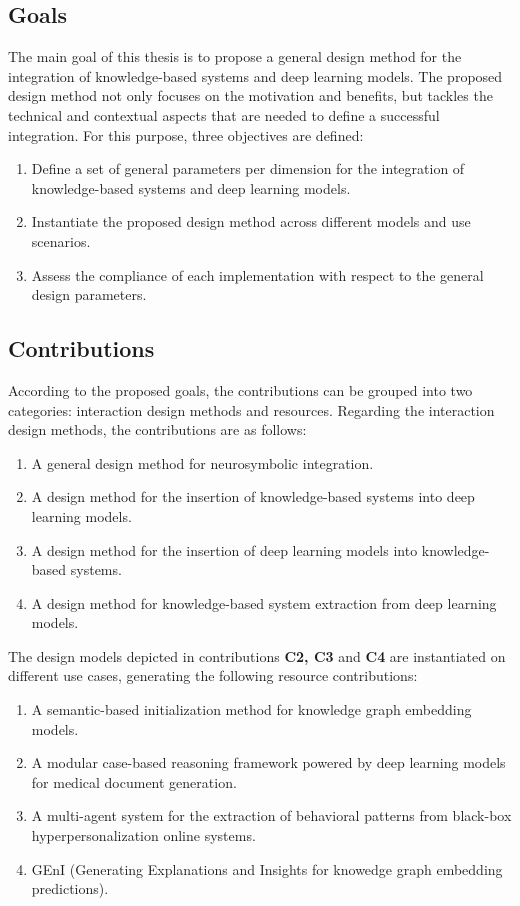 \subsection{Goals}
The main goal of this thesis is to propose a general design method for the integration of knowledge-based systems and deep learning models.  The proposed design method not only focuses on the motivation and benefits, but tackles the technical and contextual aspects that are needed to define a successful integration. For this purpose, three objectives are defined:
\begin{enumerate}[start=1,label={\bfseries O\arabic*:}]
    \item Define a set of general parameters per dimension for the integration of knowledge-based systems and deep learning models.
    \item Instantiate the proposed design method across different models and use scenarios.
    \item Assess the compliance of each implementation with respect to the general design parameters. 
\end{enumerate}

\subsection{Contributions}
According to the proposed goals, the contributions can be grouped into two categories: interaction design methods and resources.
Regarding the interaction design methods, the contributions are as follows:
\begin{enumerate}[start=1,label={\bfseries C\arabic*:}]
    \item A general design method for neurosymbolic integration.
    \item A design method for the insertion of knowledge-based systems into deep learning models.
    \item A design method for the insertion of deep learning models into knowledge-based systems.
    \item A design method for knowledge-based system extraction from deep learning models.
\end{enumerate}
The design models depicted in contributions \textbf{C2, C3} and \textbf{C4} are instantiated on different use cases, generating the following resource contributions:
\begin{enumerate}[start=5,label={\bfseries C\arabic*:}]
    \item A semantic-based initialization method for knowledge graph embedding models.
    \item A modular case-based reasoning framework powered by deep learning models for medical document generation.
    \item A multi-agent system for the extraction of behavioral patterns from black-box hyperpersonalization online systems.
    \item GEnI (Generating Explanations and Insights for knowedge graph embedding predictions).
\end{enumerate}


